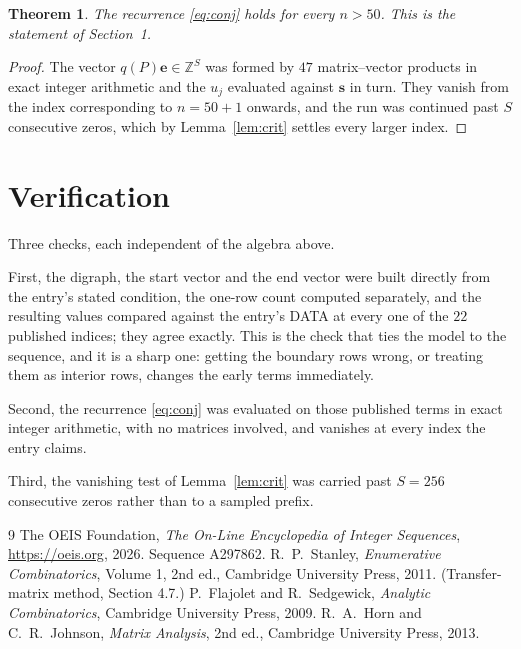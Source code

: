 \documentclass[11pt,a4paper]{article}
\theoremstyle{plain}
\newtheorem{theorem}{Theorem}
\theoremstyle{definition}
\begin{document}
\begin{theorem}
The recurrence \eqref{eq:conj} holds for every $n>50$. This is the statement of
Section~1.
\end{theorem}

\begin{proof}
The vector $q(P)\mathbf{e}\in\mathbb{Z}^{S}$ was formed by $47$ matrix--vector
products in exact integer arithmetic and the $u_j$ evaluated against $\mathbf{s}$ in turn.
They vanish from the index corresponding to $n=50+1$ onwards, and the run was continued
past $S$ consecutive zeros, which by Lemma~\ref{lem:crit} settles every larger index.
\end{proof}

\section{Verification}

Three checks, each independent of the algebra above.

First, the digraph, the start vector and the end vector were built directly from the
entry's stated condition, the one-row count computed separately, and the resulting values
compared against the entry's DATA at every one of the $22$ published indices; they
agree exactly. This is the check that ties the model to the sequence, and it is a sharp one:
getting the boundary rows wrong, or treating them as interior rows, changes the early terms
immediately.

Second, the recurrence \eqref{eq:conj} was evaluated on those published terms in exact
integer arithmetic, with no matrices involved, and vanishes at every index the entry claims.

Third, the vanishing test of Lemma~\ref{lem:crit} was carried past $S=256$ consecutive
zeros rather than to a sampled prefix.

\begin{thebibliography}{9}
 The OEIS Foundation, \emph{The On-Line Encyclopedia of Integer
Sequences}, \url{https://oeis.org}, 2026. Sequence A297862.
 R.~P.~Stanley, \emph{Enumerative Combinatorics}, Volume 1, 2nd ed.,
Cambridge University Press, 2011. (Transfer-matrix method, Section 4.7.)
 P.~Flajolet and R.~Sedgewick, \emph{Analytic Combinatorics}, Cambridge
University Press, 2009.
 R.~A.~Horn and C.~R.~Johnson, \emph{Matrix Analysis}, 2nd ed., Cambridge
University Press, 2013.
\end{thebibliography}
\end{document}
